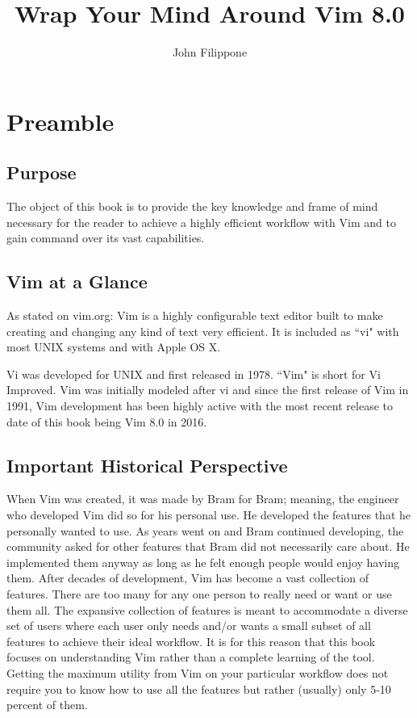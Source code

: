 \documentclass[12pt, oneside]{book}
\title{Wrap Your Mind Around Vim 8.0}
\author{John Filippone}
\begin{document}
\maketitle
\tableofcontents

\chapter{Preamble}
\section{Purpose}
The object of this book is to provide the key knowledge and frame of mind necessary for the reader to achieve a highly efficient workflow with Vim and to gain command over its vast capabilities.

\section{Vim at a Glance}
As stated on vim.org: Vim is a highly configurable text editor built to make creating and changing any kind of text very efficient. It is included as ``vi" with most UNIX systems and with Apple OS X.

\vspace{5mm}
Vi was developed for UNIX and first released in 1978.  ``Vim" is short for Vi Improved.  Vim was initially modeled after vi and since the first release of Vim in 1991, Vim development has been highly active with the most recent release to date of this book being Vim 8.0 in 2016.


\section{Important Historical Perspective}
When Vim was created, it was made by Bram for Bram; meaning, the engineer who developed Vim did so for his personal use.  He developed the features that he personally wanted to use.  As years went on
and Bram continued developing, the community asked for other features that Bram did not necessarily care about.  He implemented them anyway as long as he felt enough people would enjoy having them.
After decades of development, Vim has become a vast collection of features.  There are too many for any one person to really need or want or use them all.  The expansive collection of features is
meant to accommodate a diverse set of users where each user only needs and/or wants a small subset of all features to achieve their ideal workflow.  It is for this reason that this book focuses on
understanding Vim rather than a complete learning of the tool.  Getting the maximum utility from Vim on your particular workflow does not require you to know how to use all the features but rather
(usually) only 5-10 percent of them.
\end{document}
